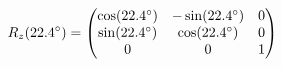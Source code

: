 \documentclass[preview]{standalone}
\begin{document}
\begin{align*}
\special{dvisvgm:raw <g id='unique000'>}R_z(22.4^\circ) = \begin{pmatrix} \cos(22.4^\circ) & -\sin(22.4^\circ) & 0 \\ \sin(22.4^\circ) & \cos(22.4^\circ) & 0 \\ 0 & 0 & 1 \end{pmatrix}\special{dvisvgm:raw </g>}
\end{align*}
\end{document}
